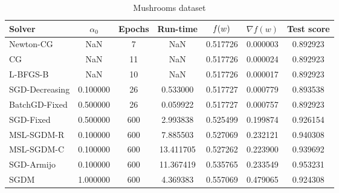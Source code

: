 \begin{table}
\caption{Mushrooms dataset}
\label{tab:mush-tab}
\centering
\begin{tabular}{lS[round-precision=3]S[drop-zero-decimal]S[round-precision=4]S[round-precision=6]S[exponent-mode=scientific]S[round-precision=6]}
\toprule
Solver & {$\alpha_0$} & {Epochs} & {Run-time} & {$\operatorname*{\mathit{f}}(w)$} & {$\nabla f(w)$} & {Test score} \\
\midrule
Newton-CG & NaN & 7 & NaN & 0.517726 & 0.000003 & 0.892923 \\
CG & NaN & 11 & NaN & 0.517726 & 0.000024 & 0.892923 \\
L-BFGS-B & NaN & 10 & NaN & 0.517726 & 0.000017 & 0.892923 \\
SGD-Decreasing & 0.100000 & 26 & 0.533000 & 0.517727 & 0.000779 & 0.893538 \\
BatchGD-Fixed & 0.500000 & 26 & 0.059922 & 0.517727 & 0.000757 & 0.892923 \\
SGD-Fixed & 0.500000 & 600 & 2.993838 & 0.525499 & 0.199874 & 0.926154 \\
MSL-SGDM-R & 0.100000 & 600 & 7.885503 & 0.527069 & 0.232121 & 0.940308 \\
MSL-SGDM-C & 0.100000 & 600 & 13.411705 & 0.527262 & 0.223900 & 0.939692 \\
SGD-Armijo & 0.100000 & 600 & 11.367419 & 0.535765 & 0.233549 & 0.953231 \\
SGDM & 1.000000 & 600 & 4.369383 & 0.557069 & 0.479065 & 0.924308 \\
\bottomrule
\end{tabular}
\end{table}

